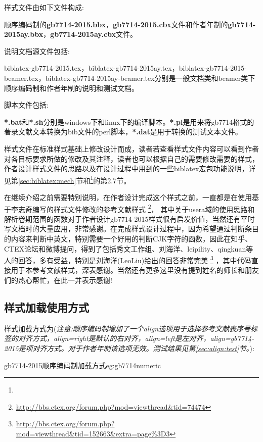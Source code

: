 样式文件由如下文件构成:

顺序编码制的\textbf{gb7714-2015.bbx}，\textbf{gb7714-2015.cbx}文件和作者年制的\textbf{gb7714-2015ay.bbx}，\textbf{gb7714-2015ay.cbx}文件。

说明文档源文件包括:

biblatex-gb7714-2015.tex，biblatex-gb7714-2015ay.tex，biblatex-gb7714-2015-beamer.tex，biblatex-gb7714-2015ay-beamer.tex分别是一般文档类和beamer类下顺序编码制和作者年制的说明和测试文档。

脚本文件包括:

\textbf{*.bat}和\textbf{*.sh}分别是windows下和linux下的编译脚本。\textbf{*.pl}是用来将gb7714格式的著录文献文本转换为bib文件的perl脚本，\textbf{*.dat}是用于转换的测试文本文件。

样式文件在标准样式基础上修改设计而成，读者若查看样式文件内容可以看到作者对各目标要求所做的修改及其注释，读者也可以根据自己的需要修改需要的样式，作者设计样式文件的思路以及在设计过程中用到的一些biblatex宏包功能说明，详见第\ref{sec:biblatex:mech}节和\footnote{}的第2.7节。

在继续介绍之前需要特别说明，在作者设计完成这个样式之前，一直都是在使用基于李志奇编写的样式文件修改的参考文献样式
\footnote{\url{http://bbs.ctex.org/forum.php?mod=viewthread&tid=74474}}，
其中关于usera域的使用思路和解析卷期范围的函数对于作者设计gb7714-2015样式很有启发价值，当然还有平时写文档时的大量应用，非常感谢。在完成样式设计过程中，因为希望通过判断条目的内容来判断中英文，特别需要一个好用的判断CJK字符的函数，因此在知乎、CTEX论坛和微博提问，得到了包括秀文工作组、刘海洋、leipility、qingkuan等人的回答，多有受益，特别是刘海洋(LeoLiu)给出的回答非常完美
\footnote{\url{http://bbs.ctex.org/forum.php?mod=viewthread&tid=152663&extra=page\%3D3}}
，其中代码直接用于本参考文献样式，深表感谢。当然还有更多这里没有提到姓名的师长和朋友们的热心帮忙，在此一并表示感谢!

\subsection{样式加载使用方式}
样式加载方式为(\emph{注意:顺序编码制增加了一个align选项用于选择参考文献表序号标签的对齐方式，align=right是默认的右对齐，align=left是左对齐，align=gb7714-2015是项对齐方式。对于作者年制该选项无效。测试结果见第\ref{sec:align:test}节。}):

\begin{codetex}{gb7714-2015顺序编码制加载方式}{eg:gb7714numeric}
\usepackage[backend=biber,style=gb7714-2015]{biblatex}
\usepackage[backend=biber,style=gb7714-2015,align=left]{biblatex}
\end{codetex}

